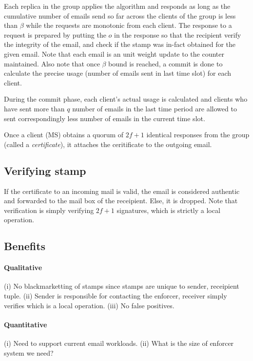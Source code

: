 \documentclass[twocolumn,10pt]{article}
\begin{document}
{Each replica in the group applies the \Sys algorithm and responds as long as the cumulative
number of emails send so far across the clients of the group is less than $\beta$ while the requests are monotonic from each client. The response to a request is prepared by putting the
$o$ in the response so that the recipient verify the integrity of the email, and check if the
stamp was in-fact obtained for the given email. Note that each email is an unit weight 
update to the counter maintained. Also note that once $\beta$ bound is reached, a commit
is done to calculate the precise usage (number of emails sent in last time slot) for each client.

During the commit phase, each client's actual usage is calculated and clients who have
sent more than $q$ number of emails in the last time period are allowed to sent
correspondingly less number of emails in the current time slot.

Once a client (MS) obtains a quorum of $2f+1$ identical responses from the group (called a 
\emph{certificate}), it 
attaches the ceritificate to the outgoing email.

\subsection{Verifying stamp}
If the certificate to an incoming mail is valid, the email is considered authentic and 
forwarded to the mail box of the receipient. Else, it is dropped. Note that verification
is simply verifying $2f+1$ signatures, which is strictly a local operation.

\subsection{Benefits}

\paragraph{Qualitative} (i) No blackmarketting of stamps since stamps are unique to sender, receipient tuple. (ii) Sender is responsible for contacting the enforcer, receiver simply verifies which is a local operation. (iii) No false positives. 

\paragraph{Quantitative} (i) Need to support current email workloads. (ii) What is the size of enforcer system we need?
\fi

}
\end{document}
